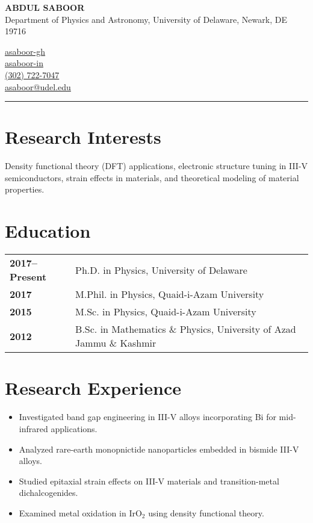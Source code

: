 \documentclass[letter,11pt]{article}
\begin{document}
\begin{minipage}{0.5\textwidth}
    \raggedright
    {\Large \textbf{ABDUL SABOOR}} \\ Department of Physics and Astronomy, University of Delaware, Newark, DE 19716 
\end{minipage}
\hfill
\begin{minipage}{0.3\textwidth}
    \raggedright
    \faGithub \quad \href{https://github.com/asaboor-gh}{asaboor-gh}\\
    \faLinkedin \quad \href{https://linkedin.com/in/asaboor-in}{asaboor-in} \\
    \faPhone \quad \href{tel:+13027227047}{(302) 722-7047} \\
    \faEnvelope \quad \href{mailto:asaboor@udel.edu}{asaboor@udel.edu}
\end{minipage}
\vspace{2mm}
\hrule
\vspace{5mm}

\section{Research Interests}
Density functional theory (DFT) applications, electronic structure tuning in III-V semiconductors, strain effects in materials, and theoretical modeling of material properties.

\section{Education}
\begin{tabular}{p{3cm} p{12cm}}
    \textbf{2017--Present} & Ph.D. in Physics, University of Delaware \\
    \textbf{2017} & M.Phil. in Physics, Quaid-i-Azam University \\
    \textbf{2015} & M.Sc. in Physics, Quaid-i-Azam University \\
    \textbf{2012} & B.Sc. in Mathematics \& Physics, University of Azad Jammu \& Kashmir \\
\end{tabular}

\section{Research Experience}

\begin{itemize}
\item Investigated band gap engineering in III-V alloys incorporating Bi for mid-infrared applications.
\item Analyzed rare-earth monopnictide nanoparticles embedded in bismide III-V alloys.

\item Studied epitaxial strain effects on III-V materials and transition-metal dichalcogenides.
\item Examined metal oxidation in IrO$_2$ using density functional theory.
\end{itemize}
\end{document}
